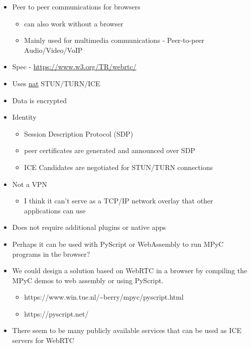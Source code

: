 \begin{itemize}
\tightlist
\item
  Peer to peer communications for browsers

  \begin{itemize}
  \tightlist
  \item
    can also work without a browser
  \item
    Mainly used for multimedia communications - Peer-to-peer
    Audio/Video/VoIP
  \end{itemize}
\item
  Spec -
  \href{https://www.w3.org/TR/webrtc/\#persistent-information-exposed-by-webrtc}{https://www.w3.org/TR/webrtc/}
\item
  Uses \href{notes/02021-internet-protocol.md}{nat} STUN/TURN/ICE
\item
  Data is encrypted
\item
  Identity

  \begin{itemize}
  \tightlist
  \item
    Session Description Protocol (SDP)
  \item
    peer certificates are generated and announced over SDP
  \item
    ICE Candidates are negotiated for STUN/TURN connections
  \end{itemize}
\item
  Not a VPN

  \begin{itemize}
  \tightlist
  \item
    I think it can't serve as a TCP/IP network overlay that other
    applications can use
  \end{itemize}
\item
  Does not require additional plugins or native apps
\item
  Perhaps it can be used with PyScript or WebAssembly to run MPyC
  programs in the browser?
\item
  We could design a solution based on WebRTC in a browser by compiling
  the MPyC demos to web assembly or using PyScript.

  \begin{itemize}
  \tightlist
  \item
    https://www.win.tue.nl/\textasciitilde berry/mpyc/pyscript.html
  \item
    https://pyscript.net/
  \end{itemize}
\item
  There seem to be many publicly available services that can be used as
  ICE servers for WebRTC


\end{itemize}
